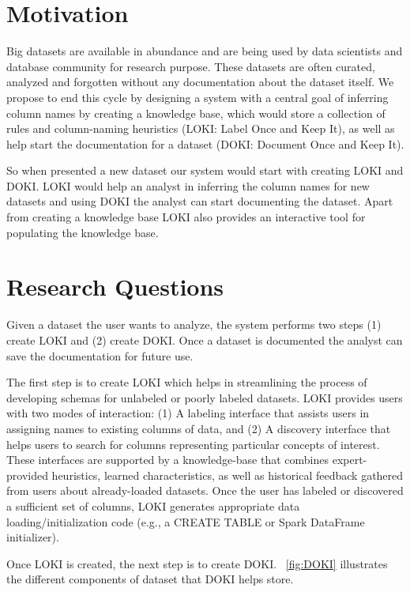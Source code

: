 \documentclass{vldb}
\begin{document}
\section{Motivation}
Big datasets are available in abundance and are being used by data scientists and database community for research purpose. These datasets are often curated, analyzed and forgotten without any documentation about the dataset itself. We propose to end this cycle by designing a system with a central goal of inferring column names by creating a knowledge base, which would store a collection of rules and column-naming heuristics (LOKI: Label Once and Keep It), as well as help start the documentation for a dataset (DOKI: Document Once and Keep It).

So when presented a new dataset our system would start with creating LOKI and DOKI. LOKI would help an analyst in inferring the column names for new datasets and using DOKI the analyst can start documenting the dataset. Apart from creating a knowledge base LOKI also provides an interactive tool for populating the knowledge base.


\section{Research Questions}
Given a dataset the user wants to analyze, the system performs two steps (1) create LOKI and (2) create DOKI. Once a dataset is documented the analyst can save the documentation for future use.  

The first step is to create LOKI which helps in streamlining the process of developing schemas for unlabeled or poorly labeled datasets. LOKI provides users with two modes of interaction: (1) A labeling interface that assists users in assigning names to existing columns of data, and (2) A discovery interface that helps users to search for columns representing particular concepts of interest. These interfaces are supported by a knowledge-base that combines expert-provided heuristics, learned characteristics, as well as historical feedback gathered from users about already-loaded datasets. Once the user has labeled or discovered a sufficient set of columns, LOKI generates appropriate data loading/initialization code (e.g., a CREATE TABLE or Spark DataFrame initializer).

Once LOKI is created, the next step is to create DOKI. ~\ref{fig:DOKI} illustrates the different components of dataset that DOKI helps store.
\end{document}
